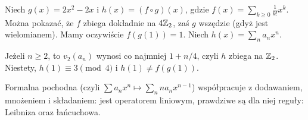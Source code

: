 \begin{przyklad}\label{leniwy}
	Niech $g(x) = 2x^2 - 2x$ i $h(x) = (f \circ g)(x)$, gdzie $f(x) = \sum_{k \ge 0} \frac{1}{k!} x^k$.
	Można pokazać, że $f$ zbiega dokładnie na $4 \mathbb Z_2$, zaś $g$ wszędzie (gdyż jest wielomianem).
	Mamy oczywiście $f(g(1)) = 1$.
	Niech $h(x) = \sum_n a_n x^n$.
	
	Jeżeli $n \ge 2$, to $v_2(a_n)$ wynosi co najmniej $1 + n / 4$, czyli $h$ zbiega na $\mathbb Z_2$.
	Niestety, $h(1) \equiv 3 \pmod {4}$ i $h(1) \neq f(g(1))$.
\end{przyklad}

\begin{fakt}
	Formalna pochodna (czyli $\sum a_n x^n \mapsto \sum_n na_n x^{n-1}$) współpracuje z dodawaniem, mnożeniem i składaniem: jest operatorem liniowym, prawdziwe są dla niej reguły: Leibniza oraz łańcuchowa.
\end{fakt}